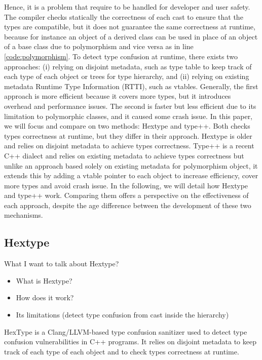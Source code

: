 \documentclass[a4paper,11pt,oneside]{report}
\begin{document}
Hence, it is a problem that require to be handled for developer and user safety.
The compiler checks statically the correctness of each cast to ensure that the
types are compatible, but it does not guarantee the same correctness at runtime, 
because for instance an object of a derived class can be used in place of an
object of a base class due to polymorphism and vice versa as in line
\ref{code:polymorphism}.  To detect type confusion at runtime, there exists two
approaches: (i) relying on disjoint metadata, such as type table to keep track
of each type of each object or trees for type hierarchy, and (ii) relying on
existing metadata Runtime Type Information (RTTI), such as vtables. 
Generally, the first approach is more efficient because it covers more types, but
it introduces overhead and performance issues. The second is faster but less
efficient due to its limitation to polymorphic classes, and it caused some crash
issue.  In this paper, we will focus and compare on two methods: Hextype and
type++.  Both checks types correctness at runtime, but they differ in their
approach. Hextype is older and relies on disjoint metadata to achieve types
correctness.  Type++ is a recent C++ dialect and relies on existing metadata to
achieve types correctness but unlike an approach based solely on existing
metadata for polymorphism object, it extends this by adding a vtable pointer to
each object to increase efficiency, cover more types and avoid crash issue. In
the following, we will detail how Hextype and type++ work.  Comparing them
offers a perspective on the effectiveness of each approach, despite the age
difference between the development of these two mechanisms.

\subsection{Hextype}
What I want to talk about Hextype?
\begin{itemize}
       \item What is Hextype?
       \item How does it work?
       \item Its limitations (detect type confusion from cast inside the hierarchy)
\end{itemize}

HexType is a Clang/LLVM-based type confusion sanitizer used to detect type
confusion vulnerabilities in C++ programs.  It relies on disjoint metadata to
keep track of each type of each object and to check types correctness at
runtime.
\end{document}
